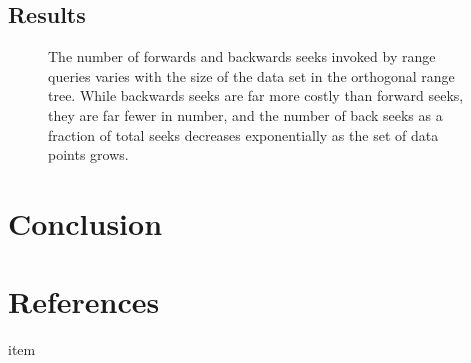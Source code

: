 \documentclass[11pt, oneside]{article}
\begin{document}
\subsection{Results}

\begin{figure}[b!]
\centering
{}%
\caption{
    The number of forwards and backwards seeks invoked by range queries varies
    with the size of the data set in the orthogonal range tree. While
    backwards seeks are far more costly than forward seeks, they are far
    fewer in number, and the number of back seeks as a fraction of total seeks
    decreases exponentially as the set of data points grows.
}
\label{fig:figure2}
\end{figure}

\section{Conclusion}


\section{References}

\noindent

\begin{description}

\item item

\end{description}
\end{document}
